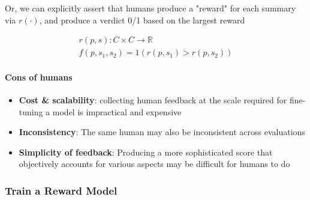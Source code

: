 \vspace{0.7cm}
Or, we can explicitly assert that humans produce a "reward" for each
summary via $r(\cdot)$, and produce a verdict 0/1 based on the largest
reward

\begin{gather*}
  r(p, s) : C \times C \to \mathbb{R} \\
  f(p, s_1, s_2) = 1(r(p, s_1) > r(p, s_2))
\end{gather*}


\paragraph{Cons of humans}

\begin{itemize}
  \item \textbf{Cost \& scalability}: collecting human feedback at the scale required for
        fine-tuning a model is impractical and expensive
  \item \textbf{Inconsistency}: The same human
        may also be inconsistent across evaluations
  \item \textbf{Simplicity of feedback}: Producing a more sophisticated score that
        objectively accounts for various aspects may be difficult for humans
        to do
\end{itemize}

\subsubsection{Train a Reward Model}


